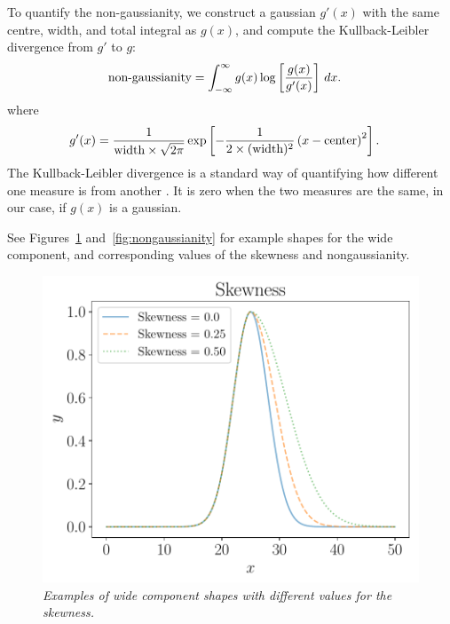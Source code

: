 \documentclass[a4paper, 12pt]{elsarticle}
\newcommand{\x}{x}
\begin{document}
To quantify the non-gaussianity, we construct a gaussian
$g'(\x)$
with the same centre, width, and total integral as $g(\x)$, and compute the
Kullback-Leibler divergence from $g'$ to $g$:
\begin{align}
\textnormal{non-gaussianity} &= 
    \int_{-\infty}^\infty g(\x) \log\left[\frac{g(\x)}{g'(\x)}\right] \, d\x.
\end{align}
where
\begin{align}
g'(\x) &= \frac{1}{\textnormal{width} \times \sqrt{2\pi}}
            \exp\left[-\frac{1}{2\times (\textnormal{width})^2}
                    \left(\x - \textnormal{center}\right)^2\right].
\end{align}
The Kullback-Leibler divergence is a standard way of quantifying how
different one measure is from another \citep{knuth2012foundations}.
It is zero when the two measures are the same, in our case,
if $g(\x)$ is a gaussian.

See Figures~\ref{fig:skewness} and~\ref{fig:nongaussianity} for example
shapes for the wide component, and corresponding values of the skewness
and nongaussianity.

\begin{figure}[!ht]
\centering
\includegraphics[scale=0.7]{figures/skewness.pdf}
\caption{\it Examples of wide component shapes with different values
for the skewness.\label{fig:skewness}}
\end{figure}
\end{document}
